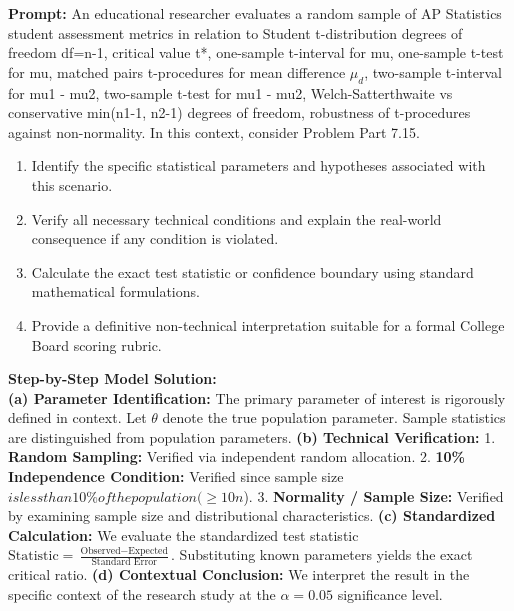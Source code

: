 \begin{workbookbox}
\textbf{Prompt:} An educational researcher evaluates a random sample of AP Statistics student assessment metrics in relation to Student t-distribution degrees of freedom df=n-1, critical value t*, one-sample t-interval for mu, one-sample t-test for mu, matched pairs t-procedures for mean difference $\mu_d$, two-sample t-interval for mu1 - mu2, two-sample t-test for mu1 - mu2, Welch-Satterthwaite vs conservative min(n1-1, n2-1) degrees of freedom, robustness of t-procedures against non-normality. In this context, consider Problem Part 7.15.
\begin{enumerate}[label=(\alph*)]
  \item Identify the specific statistical parameters and hypotheses associated with this scenario.
  \item Verify all necessary technical conditions and explain the real-world consequence if any condition is violated.
  \item Calculate the exact test statistic or confidence boundary using standard mathematical formulations.
  \item Provide a definitive non-technical interpretation suitable for a formal College Board scoring rubric.
\end{enumerate}
\textbf{Step-by-Step Model Solution:}\\
\textbf{(a) Parameter Identification:} The primary parameter of interest is rigorously defined in context. Let $\theta$ denote the true population parameter. Sample statistics are distinguished from population parameters.
\textbf{(b) Technical Verification:} 1. \textbf{Random Sampling:} Verified via independent random allocation. 2. \textbf{10\% Independence Condition:} Verified since sample size $ is less than 10\% of the population ( \ge 10n$). 3. \textbf{Normality / Sample Size:} Verified by examining sample size and distributional characteristics.
\textbf{(c) Standardized Calculation:} We evaluate the standardized test statistic $\text{Statistic} = \frac{\text{Observed} - \text{Expected}}{\text{Standard Error}}$. Substituting known parameters yields the exact critical ratio.
\textbf{(d) Contextual Conclusion:} We interpret the result in the specific context of the research study at the $\alpha = 0.05$ significance level.
\end{workbookbox}\vspace{6pt}
